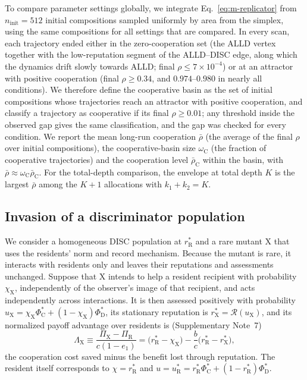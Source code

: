 To compare parameter settings globally, we integrate Eq.~\eqref{eq:m-replicator}
from $n_{\mathrm{init}}=512$ initial compositions sampled uniformly by area from
the simplex, using the same compositions for all settings that are compared.
In every scan, each trajectory ended either in the zero-cooperation set (the
ALLD vertex together with the low-reputation segment of the ALLD--DISC edge,
along which the dynamics drift slowly towards ALLD; final $\rho\le7\times10^{-4}$)
or at an attractor with positive cooperation (final $\rho\ge0.34$, and
$0.974$--$0.980$ in nearly all conditions). We therefore define the cooperative
basin as the set of initial compositions whose trajectories reach an attractor
with positive cooperation, and classify a trajectory as cooperative if its
final $\rho\ge0.01$; any threshold inside the observed gap gives the same
classification, and the gap was checked for every condition. We report the
mean long-run cooperation $\bar\rho$ (the average of the final $\rho$ over
initial compositions), the cooperative-basin size $\omega_{\mathrm C}$ (the
fraction of cooperative trajectories) and the cooperation level
$\bar\rho_{\mathrm C}$ within the basin, with
$\bar\rho\approx\omega_{\mathrm C}\bar\rho_{\mathrm C}$. For the total-depth
comparison, the envelope at total depth $K$ is the largest $\bar\rho$ among the
$K+1$ allocations with $k_1+k_2=K$.

\subsection*{Invasion of a discriminator population}

We consider a homogeneous DISC population at $r^*_{\mathrm R}$ and a rare
mutant $\mathrm X$ that uses the residents' norm and record mechanism. Because
the mutant is rare, it interacts with residents only and leaves their
reputations and assessments unchanged. Suppose that $\mathrm X$ intends to help
a resident recipient with probability $\chi_{\mathrm X}$, independently of the
observer's image of that recipient, and acts independently across interactions.
It is then assessed positively with probability
$u_{\mathrm X}=\chi_{\mathrm X}\Phi^*_{\mathrm C}+(1-\chi_{\mathrm X})\Phi^*_{\mathrm D}$,
its stationary reputation is $r^*_{\mathrm X}=\mathcal R(u_{\mathrm X})$, and its
normalized payoff advantage over residents is (Supplementary Note~7)
\begin{equation}
\Lambda_{\mathrm X}\equiv\frac{\Pi_{\mathrm X}-\Pi_{\mathrm R}}{c(1-e_1)}
=\bigl(r^*_{\mathrm R}-\chi_{\mathrm X}\bigr)
-\frac{b}{c}\bigl(r^*_{\mathrm R}-r^*_{\mathrm X}\bigr),
\label{eq:m-mutant-identity}
\end{equation}
the cooperation cost saved minus the benefit lost through reputation. The
resident itself corresponds to $\chi=r^*_{\mathrm R}$ and
$u=u^*_{\mathrm R}=r^*_{\mathrm R}\Phi^*_{\mathrm C}+(1-r^*_{\mathrm R})\Phi^*_{\mathrm D}$.

